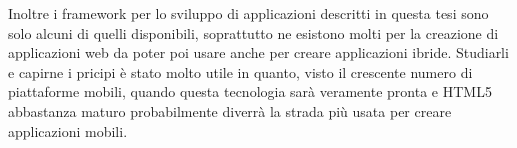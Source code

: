     Inoltre i framework per lo sviluppo di applicazioni \crossplat{} descritti
    in questa tesi sono solo alcuni di quelli disponibili, soprattutto ne
    esistono molti per la creazione di applicazioni web da poter poi usare
    anche per creare applicazioni ibride. Studiarli e capirne i pricipi è
    stato molto utile in quanto, visto il crescente numero di piattaforme
    mobili, quando questa tecnologia sarà veramente pronta e HTML5 abbastanza
    maturo probabilmente diverrà la strada più usata per creare applicazioni
    mobili.
